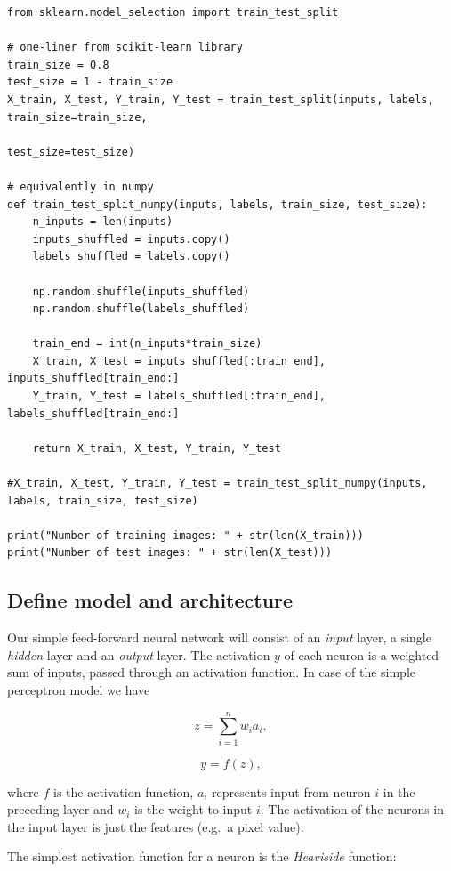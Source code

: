 \documentclass[%
oneside,                 %
final,                   %
10pt]{article}
\begin{document}
\begin{verbatim}
from sklearn.model_selection import train_test_split

# one-liner from scikit-learn library
train_size = 0.8
test_size = 1 - train_size
X_train, X_test, Y_train, Y_test = train_test_split(inputs, labels, train_size=train_size,
                                                    test_size=test_size)

# equivalently in numpy
def train_test_split_numpy(inputs, labels, train_size, test_size):
    n_inputs = len(inputs)
    inputs_shuffled = inputs.copy()
    labels_shuffled = labels.copy()
    
    np.random.shuffle(inputs_shuffled)
    np.random.shuffle(labels_shuffled)
    
    train_end = int(n_inputs*train_size)
    X_train, X_test = inputs_shuffled[:train_end], inputs_shuffled[train_end:]
    Y_train, Y_test = labels_shuffled[:train_end], labels_shuffled[train_end:]
    
    return X_train, X_test, Y_train, Y_test

#X_train, X_test, Y_train, Y_test = train_test_split_numpy(inputs, labels, train_size, test_size)

print("Number of training images: " + str(len(X_train)))
print("Number of test images: " + str(len(X_test)))
\end{verbatim}

\subsection*{Define model and architecture}

Our simple feed-forward neural network will consist of an \emph{input} layer, a single \emph{hidden} layer and an \emph{output} layer. The activation $y$ of each neuron is a weighted sum of inputs, passed through an activation function. In case of the simple perceptron model we have 

$$ z = \sum_{i=1}^n w_i a_i ,$$

$$ y = f(z) ,$$

where $f$ is the activation function, $a_i$ represents input from neuron $i$ in the preceding layer
and $w_i$ is the weight to input $i$.  
The activation of the neurons in the input layer is just the features (e.g.~a pixel value).  

The simplest activation function for a neuron is the \emph{Heaviside} function:
\end{document}
